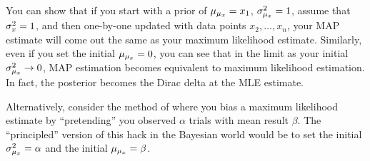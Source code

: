 You can show that if you start with a prior of $\mu_{\mu_x} = x_1$, $\sigma^2_{\mu_x}
= 1$, assume that $\sigma^2_x = 1$, and then one-by-one updated with data
points $x_2, \ldots, x_n$, your MAP estimate will come out the same as
your maximum likelihood estimate. Similarly, even if you set the initial
$\mu_{\mu_x} = 0$, you can see that in the limit as your initial $\sigma^2_{\mu_x} \to
0$, MAP estimation becomes equivalent to maximum likelihood estimation.
In fact, the posterior becomes the Dirac delta at the MLE estimate.

Alternatively, consider the method of  where you
bias a maximum likelihood estimate by ``pretending'' you observed
$\alpha$ trials with mean result $\beta$. The ``principled'' version of
this hack in the Bayesian world would be to set the initial $\sigma^2_{\mu_x} =
\alpha$ and the initial $\mu_{\mu_x} = \beta$.
